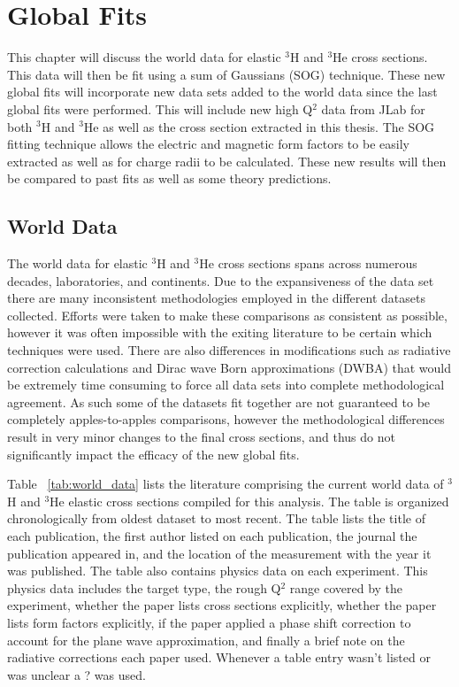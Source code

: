 \chapter{Global Fits} %
\label{ch:global_fits} %

This chapter will discuss the world data for elastic $^3$H and $^3$He cross sections. This data will then be fit using a sum of Gaussians (SOG) technique. These new global fits will incorporate new data sets added to the world data since the last global fits were performed. This will include new high Q$^2$ data from JLab for both $^3$H and $^3$He as well as the cross section extracted in this thesis. The SOG fitting technique allows the electric and magnetic form factors to be easily extracted as well as for charge radii to be calculated. These new results will then be compared to past fits as well as some theory predictions.

\section{World Data}
\label{sec:world_data}

The world data for elastic $^3$H and $^3$He cross sections spans across numerous decades, laboratories, and continents. Due to the expansiveness of the data set there are many inconsistent methodologies employed in the different datasets collected. Efforts were taken to make these comparisons as consistent as possible, however it was often impossible with the exiting literature to be certain which techniques were used. There are also differences in modifications such as radiative correction calculations and Dirac wave Born approximations (DWBA) that would be extremely time consuming to force all data sets into complete methodological agreement. As such some of the datasets fit together are not guaranteed to be completely apples-to-apples comparisons, however the methodological differences result in very minor changes to the final cross sections, and thus do not significantly impact the efficacy of the new global fits.

Table ~\ref{tab:world_data} lists the literature comprising the current world data of $^3$H and $^3$He elastic cross sections compiled for this analysis. The table is organized chronologically from oldest dataset to most recent. The table lists the title of each publication, the first author listed on each publication, the journal the publication appeared in, and the location of the measurement with the year it was published. The table also contains physics data on each experiment. This physics data includes the target type, the rough Q$^2$ range covered by the experiment, whether the paper lists cross sections explicitly, whether the paper lists form factors explicitly, if the paper applied a phase shift correction to account for the plane wave approximation, and finally a brief note on the radiative corrections each paper used. Whenever a table entry wasn't listed or was unclear a ? was used.
 

